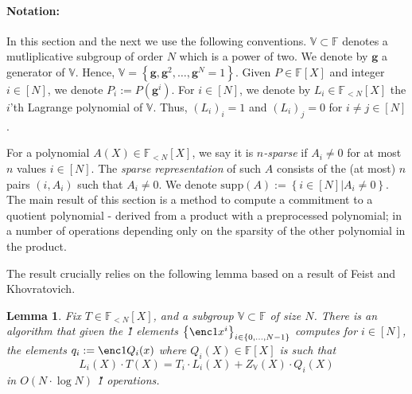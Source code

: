 \documentclass[11pt]{article} %
\newcommand{\F}{\ensuremath{\mathbb F}\xspace}
\newcommand{\defeq}{:=}
\newcommand{\sett}[2]{\ensuremath{\set{#1}_{#2}}\xspace}
\newcommand{\set}[1]{\ensuremath{\left\{#1\right\}}\xspace}
\newcommand{\vgen}{\ensuremath{\mathbf{g}}\xspace}
\newcommand{\polysofdeg}[1]{\ensuremath{\F_{< #1}[X]}\xspace}
\newtheorem{lemma}{Lemma}[section]
\newcommand{\bigspace}{\ensuremath{\mathbb{V}}\xspace}
\newcommand{\witsize}{\ensuremath{n}\xspace}
\newcommand{\tabsize}{\ensuremath{N}\xspace}
\newcommand{\supp}[1]{\ensuremath{\mathrm{supp}(#1)}\xspace}
\begin{document}
\paragraph{Notation:}
In this section and the next we use the following conventions.
$\bigspace\subset \F$ denotes a mutliplicative subgroup of order $N$ which is a power of two.
We denote by \vgen a generator of \bigspace. Hence, $\bigspace=\set{\vgen,\vgen^2,\ldots,\vgen^\tabsize =1}$.
Given $P\in \F[X]$ and integer $i\in [\tabsize]$, we denote $P_i\defeq P(\vgen^i)$.
For $i\in [\tabsize]$, we denote by $L_i\in\polysofdeg{\tabsize}$ the $i$'th Lagrange polynomial of \bigspace. Thus, $(L_i)_i=1$ and $(L_i)_j=0$ for $i\neq j\in [\tabsize]$. 

For a polynomial $A(X)\in \polysofdeg{\tabsize}$, we say it is \emph{\witsize-sparse} if $A_i\neq 0$ for at most \witsize values $i\in[\tabsize]$.
The \emph{sparse representation} of such $A$ consists of the (at most) \witsize pairs $(i,A_i)$ such that $A_i\neq 0$.
We denote $\supp{A}\defeq\set{i\in [\tabsize]| A_i\neq 0}$.\\

The main result of this section is a method to compute a commitment to a quotient polynomial - derived from a product with a preprocessed polynomial; in a number of operations depending only on the sparsity of the other polynomial in the product. 

The result crucially relies on the following lemma based on a result of Feist and Khovratovich\cite{fastkzgproofsorig}.

\begin{lemma}
\label{lem:cq-compute}
Fix $T\in \polysofdeg{\tabsize}$, and a subgroup $\bigspace\subset \F$ of size \tabsize. 
There is an algorithm that given the \G1 elements $\sett{\enc1{x^i}}{i\in \set{0,\ldots,\tabsize-1}}$ computes for $i\in [\tabsize]$, the elements 
$q_i\defeq \enc1{Q_i(x)}$
where $Q_i(X)\in \F[X]$ is such that
\[L_i(X)\cdot T(X)=T_i\cdot L_i(X) + Z_\bigspace(X)\cdot Q_i(X)\]
in $O(\tabsize\cdot \log \tabsize)$ \G1 operations.
 
\end{lemma}
\end{document}
